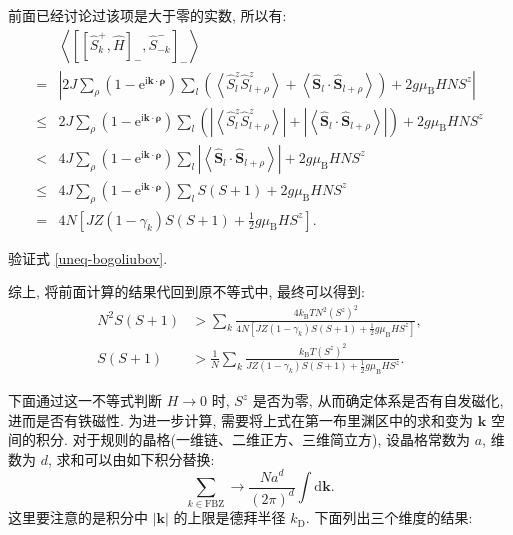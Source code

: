 前面已经讨论过该项是大于零的实数, 所以有:
\begin{align}
&\left\langle\left[\left[\hat{S}_{k}^{+}, \hat{H}\right]_{-}, \hat{S}_{-k}^{-}\right]_{-}\right\rangle\nonumber \\
=&\left|2 J \sum_{\rho}\left(1-\mathrm{e}^{\mathrm{i} \boldsymbol{k} \cdot \boldsymbol{\rho}}\right) \sum_{l}\left(\left\langle\hat{S}_{l}^{z} \hat{S}_{l+\rho}^{z}\right\rangle+\left\langle\hat{\boldsymbol S}_{l} \cdot \hat{\boldsymbol S}_{l+\rho}\right\rangle\right)+2 g \mu_{\mathrm{B}} H N S^{z}\right| \nonumber\\
\leqslant& 2 J \sum_{\rho}\left(1-\mathrm{e}^{\mathrm{i} \boldsymbol{k} \cdot \boldsymbol{\rho}}\right) \sum_{l}\left(\left|\left\langle\hat{S}_{l}^{z} \hat{S}_{l+\rho}^{z}\right\rangle\right|+\left|\left\langle\hat{\boldsymbol S}_{l} \cdot \hat{\boldsymbol S}_{l+\rho}\right\rangle\right|\right)+2 g \mu_{\mathrm{B}} H N S^{z} \nonumber\\
<& 4 J \sum_{\rho}\left(1-\mathrm{e}^{\mathrm{i} \boldsymbol{k} \cdot \boldsymbol{\rho}}\right) \sum_{l}\left|\left\langle\hat{\boldsymbol S}_{l} \cdot \hat{\boldsymbol S}_{l+\rho}\right\rangle\right|+2 g \mu_{\mathrm{B}} H N S^{z} \nonumber\\
\leqslant& 4 J \sum_{\rho}\left(1-\mathrm{e}^{\mathrm{i} \boldsymbol{k} \cdot \boldsymbol{\rho}}\right) \sum_{l} S(S+1)+2 g \mu_{\mathrm{B}} H N S^{z} \nonumber\\
=&4N\left[J  Z\left(1-\gamma_{k}\right) S(S+1)+\frac{1}{2} g \mu_{\mathrm{B}} H  S^{z}\right] .
\end{align}

\begin{question}{}{}
        验证式 \eqref{uneq-bogoliubov}. 
\end{question}

综上, 将前面计算的结果代回到原不等式中, 最终可以得到:
\begin{align}
N^{2} S(S+1) &>\sum_{k} \frac{4 k_{\mathrm{B}} T N^{2}\left(S^{z}\right)^{2}}{4N\left[ J  Z\left(1-\gamma_{k}\right) S(S+1)+\frac{1}{2} g \mu_{\mathrm{B}} H  S^{z}\right]},\nonumber \\
S(S+1) &>\frac{1}{N} \sum_{k} \frac{k_{\mathrm{B}} T\left(S^{z}\right)^{2}}{J Z\left(1-\gamma_{k}\right) S(S+1)+\frac{1}{2} g \mu_{\mathrm{B}} H S^{z}}.
\end{align}

下面通过这一不等式判断 $H\to 0$ 时, $S^{z}$ 是否为零, 从而确定体系是否有自发磁化, 进而是否有铁磁性. 为进一步计算, 需要将上式在第一布里渊区中的求和变为 $\boldsymbol k$ 空间的积分. 对于规则的晶格(一维链、二维正方、三维简立方), 设晶格常数为 $a$, 维数为 $d$, 求和可以由如下积分替换:
\begin{equation}
\sum_{k \in \mathrm{FBZ}} \longrightarrow \frac{N a^{d}}{(2 \pi)^{d}} \int \mathrm{d} \boldsymbol {k} .
\end{equation}
这里要注意的是积分中 $|\boldsymbol{k}|$ 的上限是德拜半径 $k_{\mathrm{D}}$. 下面列出三个维度的结果:

